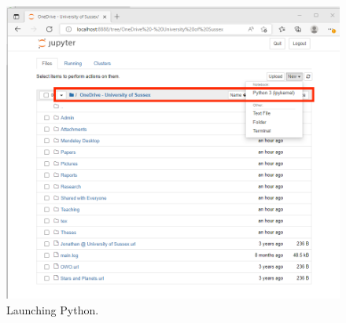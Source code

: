 \begin{figure}[htbp]  
\centering
\includegraphics[width=12cm]{Figures/python_launch.png}
\caption{Launching Python.}
\label{fig:python_launch}
\end{figure}






